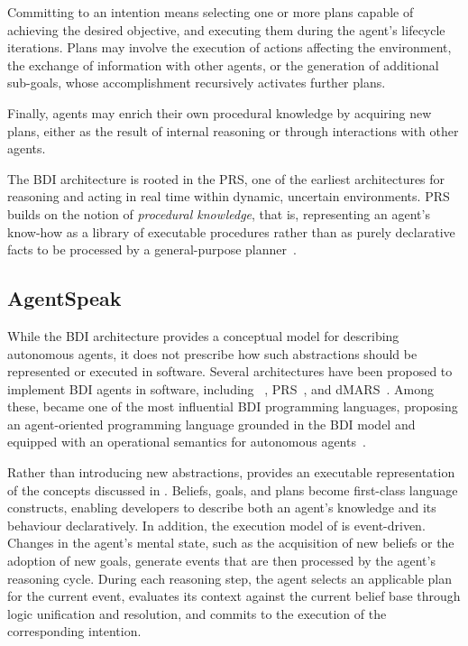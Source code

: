 Committing to an intention means selecting one or more plans
capable of achieving the desired objective,
and executing them during the agent's lifecycle iterations.
%
Plans may involve the execution of actions affecting the environment,
the exchange of information with other agents,
or the generation of additional sub-goals,
whose accomplishment recursively activates further plans.

Finally,
agents may enrich their own procedural knowledge by acquiring new plans,
either as the result of internal reasoning
or through interactions with other agents.

The \ac{BDI} architecture is rooted in the \acf{PRS}, 
one of the earliest architectures for reasoning and acting in real time within dynamic, uncertain environments.
%
\ac{PRS} builds on the notion of \emph{procedural knowledge},
that is, representing an agent's know-how as a library of executable procedures rather than as purely declarative facts to be processed by a general-purpose planner~\cite{georgeff1986pieee}.

\subsection{AgentSpeak}
\label{subsec:agentspeak}

While the \ac{BDI} architecture provides a conceptual model for describing autonomous agents, 
it does not prescribe how such abstractions should be represented or executed in software. 
%
Several architectures have been proposed to implement \ac{BDI} agents in software,
including \agentspeak{}~\cite{RaoG95}, \ac{PRS}~\cite{IngrandGR1992}, and \ac{dMARS}~\cite{DInvernoLGKW04}.
%
Among these, 
\agentspeak{} became one of the most influential \ac{BDI} programming languages, 
proposing an agent-oriented programming language grounded in the \ac{BDI} model 
and equipped with an operational semantics for autonomous agents~\cite{rao1996maamaw}.

Rather than introducing new abstractions, 
\agentspeak{} provides an executable representation of the concepts discussed in . 
%
Beliefs, goals, and plans become first-class language constructs, 
enabling developers to describe both an agent's knowledge and its behaviour declaratively.
%
In addition,
the execution model of \agentspeak{} is event-driven. 
%
Changes in the agent's mental state, 
such as the acquisition of new beliefs or the adoption of new goals, 
generate events that are then processed by the agent's reasoning cycle.
%
During each reasoning step, 
the agent selects an applicable plan for the current event, 
evaluates its context against the current belief base through logic unification and resolution, 
and commits to the execution of the corresponding intention.

